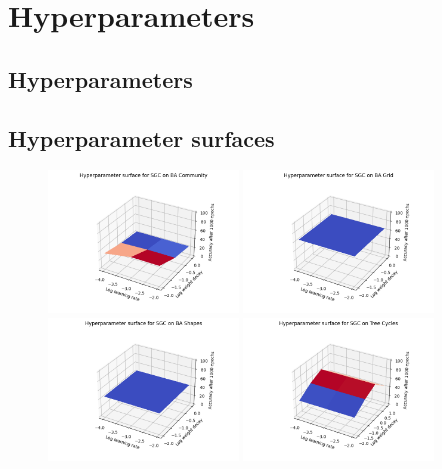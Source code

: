 \chapter{Hyperparameters}
\section{Hyperparameters}






\section{Hyperparameter surfaces}
\label{sec:surfaces}

\begin{figure}
    \centering
    \includegraphics[width=0.45\textwidth]{figures/SGC-BA-Community-surface}
    \includegraphics[width=0.45\textwidth]{figures/SGC-BA-Grid-surface}
    \includegraphics[width=0.45\textwidth]{figures/SGC-BA-Shapes-surface}
    \includegraphics[width=0.45\textwidth]{figures/SGC-Tree-Cycles-surface}

\end{figure}
